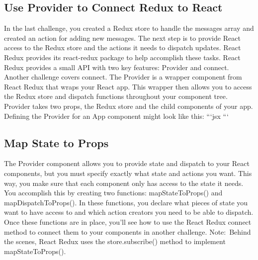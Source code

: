 \documentclass{article}%
\begin{document}
%
\subsection{Use Provider to Connect Redux to React}%
\label{subsec:UseProvidertoConnectReduxtoReact}%
In the last challenge, you created a Redux store to handle the messages array and created an action for adding new messages. The next step is to provide React access to the Redux store and the actions it needs to dispatch updates. React Redux provides its react{-}redux package to help accomplish these tasks.\newline%
React Redux provides a small API with two key features: Provider and connect. Another challenge covers connect. The Provider is a wrapper component from React Redux that wraps your React app. This wrapper then allows you to access the Redux store and dispatch functions throughout your component tree. Provider takes two props, the Redux store and the child components of your app. Defining the Provider for an App component might look like this:\newline%
```jsx\newline%
```\newline%

%
\subsection{Map State to Props}%
\label{subsec:MapStatetoProps}%
The Provider component allows you to provide state and dispatch to your React components, but you must specify exactly what state and actions you want. This way, you make sure that each component only has access to the state it needs. You accomplish this by creating two functions: mapStateToProps() and mapDispatchToProps().\newline%
In these functions, you declare what pieces of state you want to have access to and which action creators you need to be able to dispatch. Once these functions are in place, you'll see how to use the React Redux connect method to connect them to your components in another challenge.\newline%
Note:~Behind the scenes, React Redux uses the store.subscribe() method to implement mapStateToProps().\newline%

%
\end{document}
